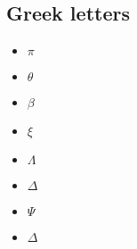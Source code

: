 \documentclass[a4paper]{article}
\begin{document}
\subsection*{Greek letters}
\begin{itemize}
\item$\pi$

\item$\theta$

\item$\beta$

\item$\xi$

\item$\Lambda$

\item$\Delta$

\item$\Psi$

\item$\Delta$
\end{itemize}


























 
\end{document}
